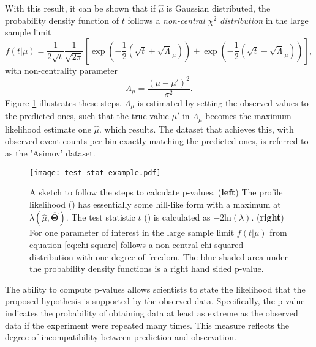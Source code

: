 With this result, it can be shown that if $\hat{\mu}$ is Gaussian distributed, the probability density function of $t$ follows a \textit{non-central $\chi^2$ distribution} in the large sample limit
\begin{equation}\label{eq:chi-square}
    f(t | \mu)=\frac{1}{2\sqrt{t}}\frac{1}{\sqrt{2\pi}}
    \left[
        \exp\left(-\frac{1}{2}\left(\sqrt{t}+\sqrt{\Lambda}_\mu\right)\right)
        +
        \exp\left(-\frac{1}{2}\left(\sqrt{t}-\sqrt{\Lambda}_\mu\right)\right)
        \right],
\end{equation}
with non-centrality parameter
\begin{equation}
    \Lambda_\mu=\frac{(\mu-\mu')^2}{\sigma^2}.
\end{equation}
Figure \ref{fig:test_stat_example} illustrates these steps. $\Lambda_\mu$ is estimated by setting the observed values to the predicted ones, such that the true value $\mu'$ in $\Lambda_\mu$ becomes the maximum likelihood estimate one $\hat{\mu}$. which results. The dataset that achieves this, with observed event counts per bin exactly matching the predicted ones, is referred to as the 'Asimov' dataset.

\begin{figure}
    \centering
    \texttt{[image: test\_stat\_example.pdf]}
    \caption[]{A sketch to follow the steps to calculate p-values. (\textbf{left}) The profile likelihood ({\color[HTML]{1f77b4}{$\bm{\diagup}$}}) has essentially some hill-like form with a maximum at ${\lambda(\hat{\mu},\hat{\bm{\Theta}})}$. The test statistic $t$ ({\color[HTML]{ff7f0e}{$\bm{\diagup}$}}) is calculated as $-2\mathrm{ln}(\lambda)$. (\textbf{right}) For one parameter of interest in the large sample limit $f(t | \mu)$ from equation \ref{eq:chi-square} follows a non-central chi-squared distribution with one degree of freedom. The blue shaded area under the probability density functions is a right hand sided p-value.}
    \label{fig:test_stat_example}
\end{figure}

The ability to compute p-values allows scientists to state the likelihood that the proposed hypothesis is supported by the observed data. Specifically, the p-value indicates the probability of obtaining data at least as extreme as the observed data if the experiment were repeated many times. This measure reflects the degree of incompatibility between prediction and observation.

